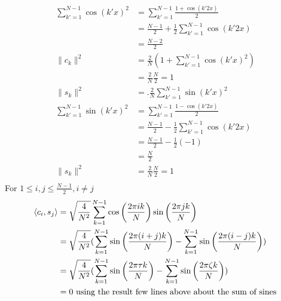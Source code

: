 \documentclass[12pt,twoside]{article}
\begin{document}
\begin{enumerate}
\begin{enumerate}
 \ \begin{align*}			
	  \sum_{k'=1}^{N-1} \cos(k' x)^2	&=    \sum_{k'=1}^{N-1}  \frac{1 + \cos(k' 2 x)} {2} \\
	  						&=	\frac{N-1}{2} + \frac{1}{2}  \sum_{k'=1}^{N-1}  \cos(k' 2 x) \\
							&=  	\frac{N-2}{2} \\
	\|c_k\|^2 					&= 	 \frac{2}{N} (1 +  \sum_{k'=1}^{N-1} \cos(k' x)^2) \\
							&=  	\frac{2}{N} \frac{N}{2} = 1 \\	
	\|s_k\|^2 					&=.  	\frac{2}{N} \sum_{k'=1}^{N-1} \sin (k' x)^2 \\
	 \sum_{k'=1}^{N-1} \sin (k' x)^2  &= 	 \sum_{k'=1}^{N-1}  \frac{1 - \cos(k' 2 x)} {2} \\	
	 						&=	 \frac{N-1}{2} -\frac{1}{2}  \sum_{k'=1}^{N-1}  \cos(k' 2 x) \\
							&= 	 \frac{N-1}{2} -\frac{1}{2} (-1) \\
							&= 	\frac{N}{2} \\
	\|s_k\|^2 					&= 	\frac{2}{N} \frac{N}{2}  = 1\\											
 \end{align*}
For $1 \leq i,j \leq \frac{N-1}{2}, i \neq j$
 \begin{align*}
 \left \langle c_i, s_j\right \rangle		&=	 \sqrt{\frac{4}{N^2}}  \sum_{k=1}^{N-1} \cos \left( \frac{2 \pi i k }{N} \right) \sin \left( \frac{2 \pi j k }{N} \right) \\
 					&=	 \sqrt{\frac{4}{N^2}}  ( \sum_{k=1}^{N-1}  \sin \left( \frac{2 \pi (i+j) k }{N} \right) - \sum_{k=1}^{N-1}  \sin \left( \frac{2 \pi (i-j) k }{N} \right)  )\\		
					&= 	 \sqrt{\frac{4}{N^2}}  ( \sum_{k=1}^{N-1}  \sin \left( \frac{2 \pi \tau k }{N} \right) - \sum_{k=1}^{N-1}  \sin \left( \frac{2 \pi \zeta k }{N} \right)  )\\		
					&= 0 \text{ using the result few lines above about the sum of sines}
  \end{align*}
   \end{enumerate}
 

\end{enumerate}
\end{document}
